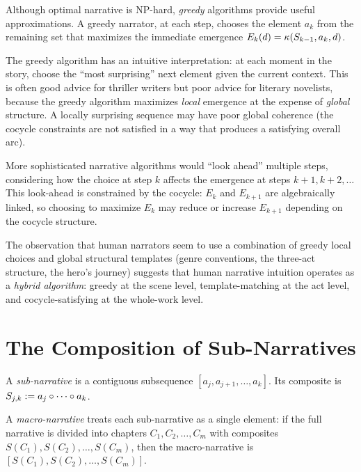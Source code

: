 \begin{remark}
\label{rem:greedy-narrative}
Although optimal narrative is NP-hard, \emph{greedy} algorithms provide
useful approximations.  A greedy narrator, at each step, chooses the element
$a_k$ from the remaining set that maximizes the immediate emergence
$E_k(d) = \kappa(S_{k-1}, a_k, d)$.

The greedy algorithm has an intuitive interpretation: at each moment in the
story, choose the ``most surprising'' next element given the current context.
This is often good advice for thriller writers but poor advice for literary
novelists, because the greedy algorithm maximizes \emph{local} emergence at
the expense of \emph{global} structure.  A locally surprising sequence may
have poor global coherence (the cocycle constraints are not satisfied in a
way that produces a satisfying overall arc).

More sophisticated narrative algorithms would ``look ahead'' multiple steps,
considering how the choice at step $k$ affects the emergence at steps
$k+1, k+2, \ldots$  This look-ahead is constrained by the cocycle:
$E_k$ and $E_{k+1}$ are algebraically linked, so choosing to maximize
$E_k$ may reduce or increase $E_{k+1}$ depending on the cocycle structure.

The observation that human narrators seem to use a combination of greedy
local choices and global structural templates (genre conventions, the
three-act structure, the hero's journey) suggests that human narrative
intuition operates as a \emph{hybrid algorithm}: greedy at the scene level,
template-matching at the act level, and cocycle-satisfying at the whole-work
level.
\end{remark}


\section{The Composition of Sub-Narratives}

\begin{definition}
\label{def:sub-narrative}
A \emph{sub-narrative} is a contiguous subsequence $[a_j, a_{j+1}, \ldots, a_k]$.
Its composite is $S_{j,k} := a_j \circ \cdots \circ a_k$.

A \emph{macro-narrative} treats each sub-narrative as a single element:
if the full narrative is divided into chapters $C_1, C_2, \ldots, C_m$
with composites $S(C_1), S(C_2), \ldots, S(C_m)$, then the macro-narrative
is $[S(C_1), S(C_2), \ldots, S(C_m)]$.
\end{definition}

